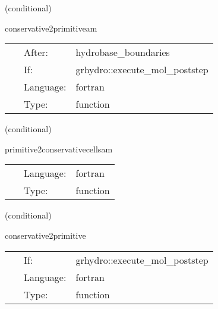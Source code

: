 \vspace{5mm}

   (conditional) 

\hspace{5mm} conservative2primitiveam 

\hspace{5mm}{\it convert back to primitive variables (general) - mhd with avec version } 


\hspace{5mm}

 \begin{tabular*}{160mm}{cll} 
~ & After:  & hydrobase\_boundaries \\ 
~ & If:  & grhydro::execute\_mol\_poststep \\ 
~ & Language:  & fortran \\ 
~ & Type:  & function \\ 
\end{tabular*} 


\vspace{5mm}

   (conditional) 

\hspace{5mm} primitive2conservativecellsam 

\hspace{5mm}{\it convert initial data given in primive variables to conserved variables - mhd with avec version } 


\hspace{5mm}

 \begin{tabular*}{160mm}{cll} 
~ & Language:  & fortran \\ 
~ & Type:  & function \\ 
\end{tabular*} 


\vspace{5mm}

   (conditional) 

\hspace{5mm} conservative2primitive 

\hspace{5mm}{\it convert back to primitive variables (general) } 


\hspace{5mm}

 \begin{tabular*}{160mm}{cll} 
~ & If:  & grhydro::execute\_mol\_poststep \\ 
~ & Language:  & fortran \\ 
~ & Type:  & function \\ 
\end{tabular*} 


